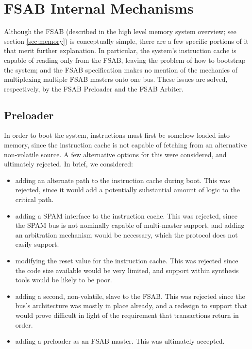 \documentclass[10pt]{report}
\begin{document}
\section{FSAB Internal Mechanisms}
\label{sec:fsabinternal}

Although the FSAB (described in the high level memory system overview; see
section \ref{sec:memory}) is conceptually simple, there are a few specific
portions of it that merit further explanation.  In particular, the system's
instruction cache is capable of reading only from the FSAB, leaving the
problem of how to bootstrap the system; and the FSAB specification makes no
mention of the mechanics of multiplexing multiple FSAB masters onto one bus. 
These issues are solved, respectively, by the FSAB Preloader and the FSAB
Arbiter.

\subsection{Preloader}
\label{sec:preloader}

In order to boot the system, instructions must first be somehow loaded into
memory, since the instruction cache is not capable of fetching from an
alternative non-volatile source. A few alternative options for this were
considered, and ultimately rejected. In brief, we considered:

\begin{itemize}
\item{adding an alternate path to the instruction cache during boot. This
was rejected, since it would add a potentially substantial amount of logic
to the critical path.}
\item{adding a SPAM interface to the instruction cache. This was rejected,
since the SPAM bus is not nominally capable of multi-master support, and
adding an arbitration mechanism would be necessary, which the protocol does
not easily support.}
\item{modifying the reset value for the instruction cache. This was rejected
since the code size available would be very limited, and support within
synthesis tools would be likely to be poor.}
\item{adding a second, non-volatile, slave to the FSAB. This was rejected
since the bus's architecture was mostly in place already, and a redesign to
support that would prove difficult in light of the requirement that
transactions return in order.}
\item{adding a preloader as an FSAB master. This was ultimately accepted.}
\end{itemize}
\end{document}
